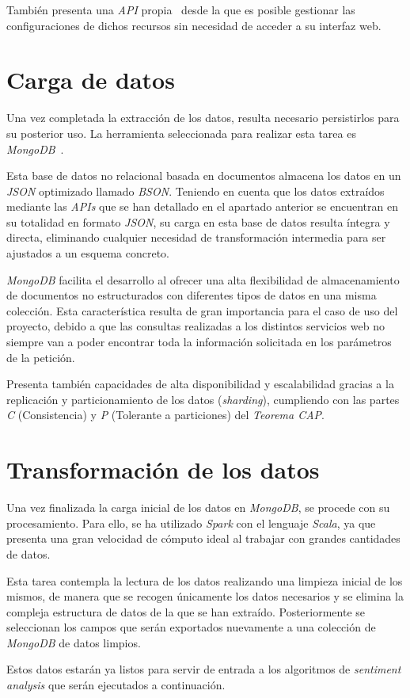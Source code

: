 También presenta una \textit{API} propia~\cite{airbyteAPI} desde la que es posible gestionar las configuraciones de dichos recursos sin necesidad de acceder a su interfaz web.


\section{Carga de datos}

Una vez completada la extracción de los datos, resulta necesario persistirlos para su posterior uso. La herramienta seleccionada para realizar esta tarea es \textit{MongoDB}~\cite{mongodbArchitecture}.

Esta base de datos no relacional basada en documentos almacena los datos en un \textit{JSON} optimizado llamado \textit{BSON}. Teniendo en cuenta que los datos extraídos mediante las \textit{APIs} que se han detallado en el apartado anterior se encuentran en su totalidad en formato \textit{JSON}, su carga en esta base de datos resulta íntegra y directa, eliminando cualquier necesidad de transformación intermedia para ser ajustados a un esquema concreto.

\textit{MongoDB} facilita el desarrollo al ofrecer una alta flexibilidad de almacenamiento de documentos no estructurados con diferentes tipos de datos en una misma colección. Esta característica resulta de gran importancia para el caso de uso del proyecto, debido a que las consultas realizadas a los distintos servicios web no siempre van a poder encontrar toda la información solicitada en los parámetros de la petición.

Presenta también capacidades de alta disponibilidad y escalabilidad gracias a la replicación y particionamiento de los datos (\textit{sharding}), cumpliendo con las partes \textit{C} (Consistencia) y \textit{P} (Tolerante a particiones) del \textit{Teorema CAP}.

\section{Transformación de los datos}

Una vez finalizada la carga inicial de los datos en \textit{MongoDB}, se procede con su procesamiento. Para ello, se ha utilizado \textit{Spark} con el lenguaje \textit{Scala}, ya que presenta una gran velocidad de cómputo ideal al trabajar con grandes cantidades de datos.

Esta tarea contempla la lectura de los datos realizando una limpieza inicial de los mismos, de manera que se recogen únicamente los datos necesarios y se elimina la compleja estructura de datos de la que se han extraído. Posteriormente se seleccionan los campos que serán exportados nuevamente a una colección de \textit{MongoDB} de datos limpios.

Estos datos estarán ya listos para servir de entrada a los algoritmos de \textit{sentiment analysis} que serán ejecutados a continuación.